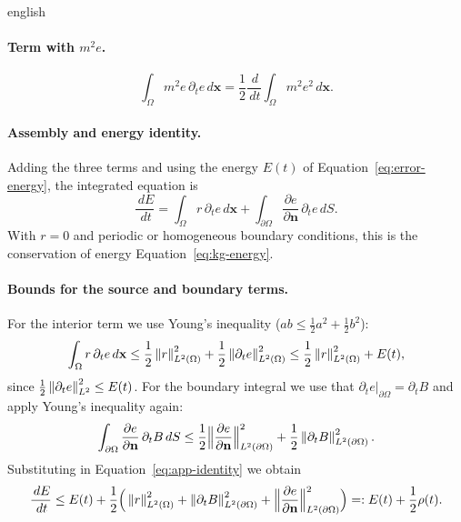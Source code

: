 \begin{hyphenrules}{english}
\paragraph{Term with $m^2e$.}
\[
  \int_\Omega m^2e\,\partial_te\,d\mathbf{x}=\frac12\frac{\,d}{\,d t}\int_\Omega m^2e^2\,d\mathbf{x}.
\]

\paragraph{Assembly and energy identity.}
Adding the three terms and using the energy $E(t)$ of Equation~\eqref{eq:error-energy}, the integrated equation is
\begin{equation}
  \frac{\,d E}{\,d t}=\int_\Omega r\,\partial_te\,d\mathbf{x}+\int_{\partial\Omega}\frac{\partial e}{\partial\mathbf{n}}\,\partial_te\,d S.
  \label{eq:app-identity}
\end{equation}
With $r=0$ and periodic or homogeneous boundary conditions, this is the conservation of energy
Equation~\eqref{eq:kg-energy}.

\paragraph{Bounds for the source and boundary terms.}
For the interior term we use Young's inequality ($ab\le\frac12a^2+\frac12b^2$):
\[
  \int_\Omega r\,\partial_te\,d\mathbf{x}\le\frac12\left\lVert r \right\rVert^2_{L^2(\Omega)}+\frac12\left\lVert \partial_te \right\rVert^2_{L^2(\Omega)}
  \le\frac12\left\lVert r \right\rVert^2_{L^2(\Omega)}+E(t),
\]
since $\frac12\left\lVert \partial_te \right\rVert^2_{L^2}\le E(t)$. For the boundary integral we use that
$\partial_te|_{\partial\Omega}=\partial_tB$ and apply Young's inequality again:
\[
  \int_{\partial\Omega}\frac{\partial e}{\partial\mathbf{n}}\,\partial_tB\,d S
  \le\frac12\Big\|\frac{\partial e}{\partial\mathbf{n}}\Big\|^2_{L^2(\partial\Omega)}+\frac12\left\lVert \partial_tB \right\rVert^2_{L^2(\partial\Omega)}.
\]
Substituting in Equation~\eqref{eq:app-identity} we obtain
\begin{equation}
  \frac{\,d E}{\,d t}\le E(t)+\frac12\Big(\left\lVert r \right\rVert^2_{L^2(\Omega)}+\left\lVert \partial_tB \right\rVert^2_{L^2(\partial\Omega)}
  +\Big\|\frac{\partial e}{\partial\mathbf{n}}\Big\|^2_{L^2(\partial\Omega)}\Big)=:E(t)+\frac12\rho(t).
  \label{eq:app-differential}
\end{equation}


\end{hyphenrules}
